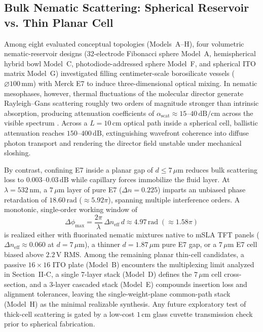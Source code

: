 \documentclass[journal]{IEEEtran}
\begin{document}
\subsection{Bulk Nematic Scattering: Spherical Reservoir vs. Thin Planar Cell}
Among eight evaluated conceptual topologies (Models~A--H), four volumetric nematic-reservoir designs (32-electrode Fibonacci sphere Model~A, hemispherical hybrid bowl Model~C, photodiode-addressed sphere Model~F, and spherical ITO matrix Model~G) investigated filling centimeter-scale borosilicate vessels ($\varnothing 100\,\text{mm}$) with Merck E7 to induce three-dimensional optical mixing. In nematic mesophases, however, thermal fluctuations of the molecular director generate Rayleigh--Gans scattering roughly two orders of magnitude stronger than intrinsic absorption, producing attenuation coefficients of $\alpha_{\mathrm{scat}} \approx 15\text{--}40\,\text{dB/cm}$ across the visible spectrum \cite{wu1987scattering}. Across a $L = 10\,\text{cm}$ optical path inside a spherical cell, ballistic attenuation reaches $150\text{--}400\,\text{dB}$, extinguishing wavefront coherence into diffuse photon transport and rendering the director field unstable under mechanical sloshing.

By contrast, confining E7 inside a planar gap of $d \le 7\,\mu\text{m}$ reduces bulk scattering loss to $0.003\text{--}0.03\,\text{dB}$ while capillary forces immobilize the fluid layer. At $\lambda = 532\,\text{nm}$, a $7\,\mu\text{m}$ layer of pure E7 ($\Delta n = 0.225$) imparts an unbiased phase retardation of $18.60\,\text{rad}$ ($\approx 5.92\pi$), spanning multiple interference orders. A monotonic, single-order working window of
\begin{equation}
  \Delta\phi_{\max} = \frac{2\pi}{\lambda}\,\Delta n_{\mathrm{eff}}\, d \approx 4.97\,\text{rad} \; (\approx 1.58\pi)
  \label{eq:max_phase}
\end{equation}
is realized either with fluorinated nematic mixtures native to mSLA TFT panels ($\Delta n_{\mathrm{eff}} \approx 0.060$ at $d = 7\,\mu\text{m}$), a thinner $d = 1.87\,\mu\text{m}$ pure E7 gap, or a $7\,\mu\text{m}$ E7 cell biased above $2.2\,\text{V}$ RMS. Among the remaining planar thin-cell candidates, a passive $16\times 16$ ITO plate (Model~B) encounters the multiplexing limit analyzed in Section~II-C, a single 7-layer stack (Model~D) defines the $7\,\mu\text{m}$ cell cross-section, and a 3-layer cascaded stack (Model~E) compounds insertion loss and alignment tolerances, leaving the single-weight-plane common-path stack (Model~H) as the minimal realizable synthesis. Any future exploratory test of thick-cell scattering is gated by a low-cost $1\,\text{cm}$ glass cuvette transmission check prior to spherical fabrication.
\end{document}
